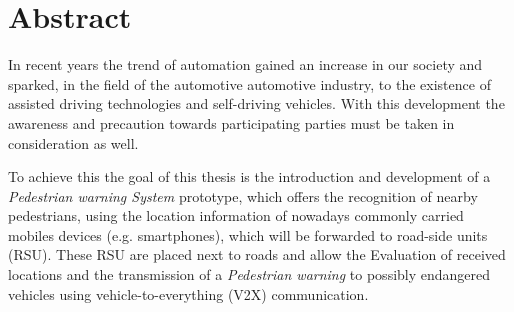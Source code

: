 \chapter{Abstract}

In recent years the trend of automation gained an increase in our society and sparked, in the field of the automotive automotive industry, to the existence of assisted driving technologies and self-driving vehicles. With this development the awareness and precaution towards participating parties must be taken in consideration as well.

To achieve this the goal of this thesis is the introduction and development of a \textit{Pedestrian warning System} prototype, which offers the recognition of nearby pedestrians, using the location information of nowadays commonly carried mobiles devices (e.g. smartphones), which will be forwarded to road-side units (RSU). These RSU are placed next to roads and allow the Evaluation of received locations and the transmission of a \textit{Pedestrian warning} to possibly endangered vehicles using vehicle-to-everything (V2X) communication.


